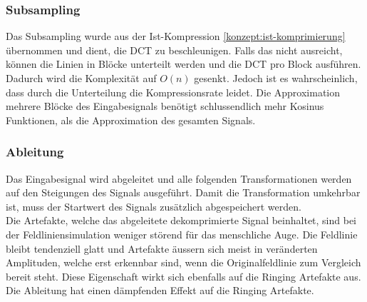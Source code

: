 \subsubsection{Subsampling} \label{konzept:loesung1:subsampling}
Das Subsampling wurde aus der Ist-Kompression \ref{konzept:ist-komprimierung} übernommen und dient, die DCT zu beschleunigen. Falls das nicht ausreicht, können die Linien in Blöcke unterteilt werden und die DCT pro Block ausführen. Dadurch wird die Komplexität auf $O(n)$ gesenkt. Jedoch ist es wahrscheinlich, dass durch die Unterteilung die Kompressionsrate leidet. Die Approximation mehrere Blöcke des Eingabesignals benötigt schlussendlich mehr Kosinus Funktionen, als die Approximation des gesamten Signals.

\subsubsection{Ableitung}
Das Eingabesignal wird abgeleitet und alle folgenden Transformationen werden auf den Steigungen des Signals ausgeführt. Damit die Transformation umkehrbar ist, muss der Startwert des Signals zusätzlich abgespeichert werden.\\
Die Artefakte, welche das abgeleitete dekomprimierte Signal beinhaltet, sind bei der Feldliniensimulation weniger störend für das menschliche Auge. Die Feldlinie bleibt tendenziell glatt und Artefakte äussern sich meist in veränderten Amplituden, welche erst erkennbar sind, wenn die Originalfeldlinie zum Vergleich bereit steht. Diese Eigenschaft wirkt sich ebenfalls auf die Ringing Artefakte aus. Die Ableitung hat einen dämpfenden Effekt auf die Ringing Artefakte.

